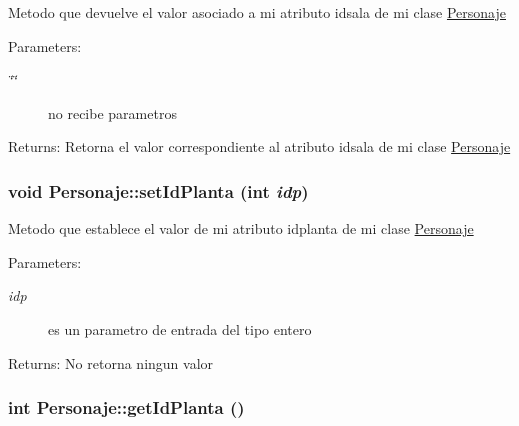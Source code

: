 Metodo que devuelve el valor asociado a mi atributo idsala de mi clase \hyperlink{classPersonaje}{Personaje} \begin{Desc}
\item[Parameters:]
\begin{description}
\item[{\em \char`\"{}\char`\"{}}]no recibe parametros \end{description}
\end{Desc}
\begin{Desc}
\item[Returns:]Retorna el valor correspondiente al atributo idsala de mi clase \hyperlink{classPersonaje}{Personaje} \end{Desc}
\hypertarget{classPersonaje_361e72e69c915f6e0c7d2c5e82ae0744}{
\subsubsection[setIdPlanta]{\setlength{\rightskip}{0pt plus 5cm}void Personaje::setIdPlanta (int {\em idp})}}
\label{classPersonaje_361e72e69c915f6e0c7d2c5e82ae0744}


Metodo que establece el valor de mi atributo idplanta de mi clase \hyperlink{classPersonaje}{Personaje} \begin{Desc}
\item[Parameters:]
\begin{description}
\item[{\em idp}]es un parametro de entrada del tipo entero \end{description}
\end{Desc}
\begin{Desc}
\item[Returns:]No retorna ningun valor \end{Desc}
\hypertarget{classPersonaje_f388d329d466b136c60fa26c6c4800a7}{
\subsubsection[getIdPlanta]{\setlength{\rightskip}{0pt plus 5cm}int Personaje::getIdPlanta ()}}
\label{classPersonaje_f388d329d466b136c60fa26c6c4800a7}


